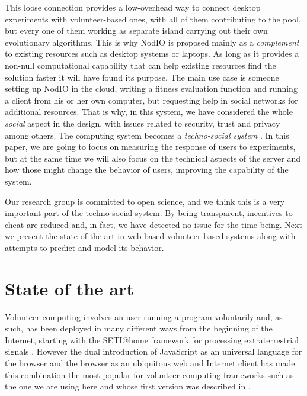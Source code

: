 \documentclass[letterpaper]{article}
\begin{document}
This loose connection provides a low-overhead way to connect desktop
experiments with volunteer-based ones, with all of them contributing
to the pool, but every one of them working as separate island 
carrying out their own evolutionary algorithms. This is why NodIO is
proposed mainly as a {\em complement} to existing resources such as
desktop systems or laptops. As long as it provides a non-null
computational capability that can help existing resources find the
solution faster it will have found its purpose. The main use case is
someone setting up NodIO in the cloud, writing a fitness evaluation
function and running a client from his or her own computer, but
requesting help in social networks for additional resources. That is
why, in this system,  we have considered the whole {\em social} aspect
in the design, with issues related to security, trust and privacy
among others. The computing system becomes a {\em techno-social
  system} \citep{vespignani2009predicting}. In this paper, we are going
to focus on measuring the response of users to experiments, but at the
same time we will also focus on the technical aspects of the server and how
those might change the behavior of users, improving the capability of %
the system.

Our research group is committed to open science, and we think this is
a very important part of the techno-social system. By being
transparent, incentives to cheat are reduced and, in fact, we have
detected no issue for the time being. Next we present the state of the art in web-based
volunteer-based systems along with attempts to predict and model its
behavior. 


\section{State of the art}
\label{sec:soa}

Volunteer computing involves an user running a program voluntarily
and, as such, has been deployed in many different ways from the
beginning of the Internet, starting with the SETI@home framework for
processing extraterrestrial signals \citep{david-seti:home}. However
the dual introduction of JavaScript as an universal language for the
browser and the browser as an ubiquitous web and Internet client has
made this combination the most popular for volunteer computing
frameworks such as the one we are using here and whose first version
was described in \citep{DBLP:conf/gecco/GuervosG15}.
\end{document}
